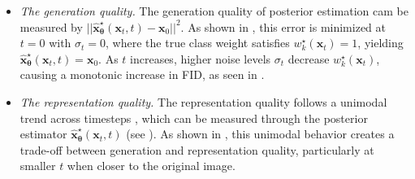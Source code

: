 \begin{itemize}[leftmargin=*]
    \item \emph{The generation quality.} The generation quality of posterior estimation cam be measured by $||\hat{\bm x}_{\bm \theta}^{\star}(\bm x_t, t) - \bm x_0||^2$. As shown in , this error is minimized at $t=0$ with $\sigma_t=0$, where the true class weight satisfies $w^{\star}_k(\bm x_t) = 1$, yielding $\hat{\bm x}_{\bm \theta}^{\star}(\bm x_t, t) = \bm x_0$. As $t$ increases, higher noise levels $\sigma_t$ decrease $w^{\star}_k(\bm x_t)$, causing a monotonic increase in FID, as seen in .
    \item \emph{The representation quality.} The representation quality follows a unimodal trend across timesteps \citep{xiang2023denoising,tang2023emergent}, which can be measured through the posterior estimator $\hat{\bm x}_{\bm \theta}^{\star}(\bm x_t, t)$ (see ). As shown in , this unimodal behavior creates a trade-off between generation and representation quality, particularly at smaller $t$ when closer to the original image.
\end{itemize}





